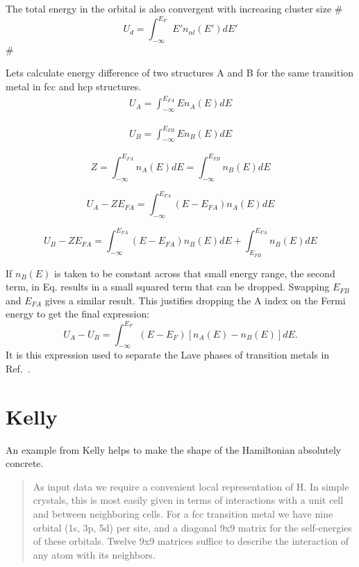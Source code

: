 The total energy in the orbital is also convergent with increasing cluster size
#
\begin{equation}
U_{d} = \int_{-\infty}^{E_{F}}E'n_{\alpha l}(E') dE'
\end{equation}
#

Lets calculate energy difference of two structures A and B for the same transition metal
in fcc and hcp structures.
%
\begin{eqnarray}
\label{eq:Ua}
U_{A} = \int_{-\infty}^{E_{FA}} E n_{A}(E) dE
\end{eqnarray}

\begin{eqnarray}
\label{eq:Ub}
U_{B} = \int_{-\infty}^{E_{FB}} E n_{B}(E) dE
\end{eqnarray}

\begin{equation}
\label{eq:totaldos}
Z = \int_{-\infty}^{E_{FA}} n_{A}(E)dE = \int_{-\infty}^{E_{FB}}n_{B}(E)dE
\end{equation}

\begin{equation}
U_{A}-ZE_{FA}= \int_{-\infty}^{E_{FA}}(E-E_{FA})n_{A}(E)dE
\end{equation}

\begin{equation}
U_{B}-ZE_{FA}= \int_{-\infty}^{E_{FA}}(E-E_{FA})n_{B}(E)dE + \int_{E_{FB}}^{E_{FA}}n_{B}(E)dE
\end{equation}

If $n_{B}(E)$ is taken to be constant across that small energy range, the second term, in
Eq. results in a small squared term that can be dropped. Swapping $E_{FB}$ and $E_{FA}$ gives
a similar result. This justifies dropping the A index on the Fermi energy to get the
final expression:
%
\begin{equation}
U_{A}-U_{B} = \int_{-\infty}^{E_{F}}(E-E_{F})[n_{A}(E) -n_{B}(E)]dE.
\end{equation}
%
It is this expression used to separate the Lave phases of transition metals in  Ref.~\cite{haydock76}.

\section{Kelly}
An example from Kelly helps to make the shape of the Hamiltonian absolutely 
concrete.

\begin{quote}
As input data we require a convenient local representation of H. In simple crystals,
this is most easily given in terms of interactions with a unit cell and between neighboring cells.
For a fcc transition metal we have nine orbital (1s, 3p, 5d) per site, and a diagonal 9x9 matrix
for the self-energies of these orbitals. Twelve 9x9 matrices suffice to describe the interaction 
of any atom with its neighbors.
\end{quote}

